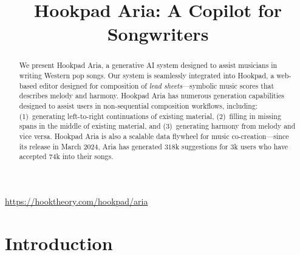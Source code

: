 \documentclass{article}
\title{Hookpad Aria: A Copilot for Songwriters}
\newcommand\sysname{Hookpad Aria}
\newcommand\hookpad{Hookpad}
\newcommand{\todo}[1]{{\color{red}[TODO: #1]}}
\newcommand{\yewon}[1]{{\color{blue}[YW: #1]}}
\begin{document}
%
\maketitle

\url{https://hooktheory.com/hookpad/aria}

\begin{abstract}
We present \sysname, a generative AI system designed to assist musicians in writing Western pop songs. 
Our system is seamlessly integrated into \hookpad{}, a web-based editor designed for composition of \emph{lead sheets}---symbolic music scores that describes melody and harmony. 
\sysname{} has numerous generation capabilities designed to assist users in non-sequential composition workflows, including: 
(1)~generating left-to-right continuations of existing material, 
(2)~filling in missing spans in the middle of existing material, 
and 
(3)~generating harmony from melody and vice versa. 
\sysname{} is also a scalable data flywheel for music co-creation---since its release in March 2024, Aria has generated $318$k suggestions for $3$k users who have accepted $74$k into their songs.
\end{abstract}
%

\vspace{-3mm}
\section{Introduction}\label{sec:introduction}


\end{document}
